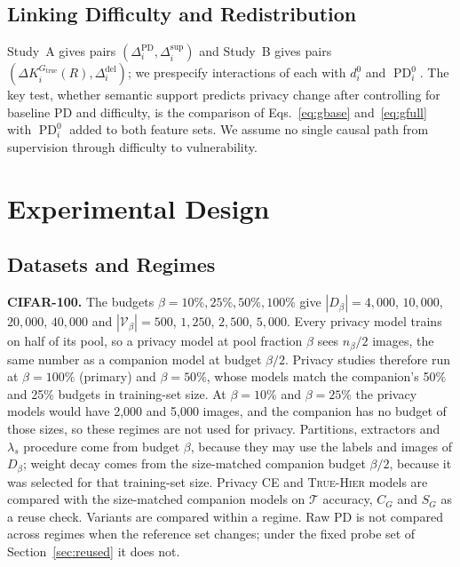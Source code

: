 \documentclass{article} %
\newcommand{\cn}[1]{\textsc{#1}}
\newcommand{\Gtrue}{G_{\mathrm{true}}}
\newcommand{\PD}{\operatorname{PD}}
\newcommand{\valset}{\mathcal{V}}
\newcommand{\testset}{\mathcal{T}}
\begin{document}
\subsection{Linking Difficulty and Redistribution}
\label{sec:linking}

Study~A gives pairs $(\Delta_i^{\mathrm{PD}},\Delta_i^{\mathrm{sup}})$ and Study~B gives pairs $(\Delta K_i^{\Gtrue}(R),\Delta_i^{\mathrm{del}})$; we prespecify interactions of each with $d_i^0$ and $\PD_i^0$. The key test, whether semantic support predicts privacy change after controlling for baseline PD and difficulty, is the comparison of Eqs.~\ref{eq:gbase} and~\ref{eq:gfull} with $\PD_i^0$ added to both feature sets. We assume no single causal path from supervision through difficulty to vulnerability.

\section{Experimental Design}
\label{sec:experiments}

\subsection{Datasets and Regimes}
\label{sec:datasets}

\textbf{CIFAR-100.} The budgets $\beta=10\%,25\%,50\%,100\%$ give $|D_\beta|=4{,}000$, $10{,}000$, $20{,}000$, $40{,}000$ and $|\valset_\beta|=500$, $1{,}250$, $2{,}500$, $5{,}000$. Every privacy model trains on half of its pool, so a privacy model at pool fraction $\beta$ sees $n_\beta/2$ images, the same number as a companion model at budget $\beta/2$. Privacy studies therefore run at $\beta=100\%$ (primary) and $\beta=50\%$, whose models match the companion's 50\% and 25\% budgets in training-set size. At $\beta=10\%$ and $\beta=25\%$ the privacy models would have 2,000 and 5,000 images, and the companion has no budget of those sizes, so these regimes are not used for privacy. Partitions, extractors and $\lambda_s$ procedure come from budget $\beta$, because they may use the labels and images of $D_\beta$; weight decay comes from the size-matched companion budget $\beta/2$, because it was selected for that training-set size. Privacy \cn{CE} and \cn{True-Hier} models are compared with the size-matched companion models on $\testset$ accuracy, $C_G$ and $S_G$ as a reuse check. Variants are compared within a regime. Raw PD is not compared across regimes when the reference set changes; under the fixed probe set of Section~\ref{sec:reused} it does not.
\end{document}
